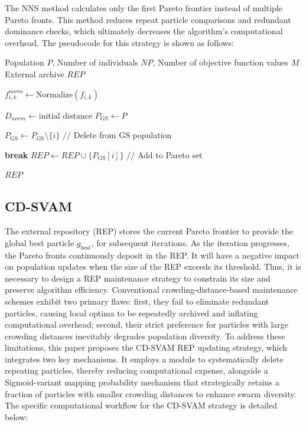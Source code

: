 \documentclass[lettersize,journal]{IEEEtran}
\begin{document}
The NNS method calculates only the first Pareto frontier instead of multiple Pareto fronts. This method reduces repeat particle comparisons and redundant dominance checks, which ultimately decreases the algorithm's computational overhead. The pseudocode for this strategy is shown as follows:
\begin{algorithm}[H]
\caption{GS-NNS Strategy}\label{alg:GS_Strategy}
\renewcommand{\algorithmicrequire}{\textbf{Input:}}
\renewcommand{\algorithmicensure}{\textbf{Output:}}
\begin{algorithmic}[1] %
\REQUIRE Population $P$, Number of individuals $NP$, Number of objective function values $M$
\ENSURE External archive $REP$

        \STATE $f_{i,k}^{norm} \gets \text{Normalize}(f_{i,k})$
    \ENDFOR
\ENDFOR

\STATE $D_{norm} \gets \text{initial distance}$
\STATE $P_{\text{GS}} \gets P$ 

        \STATE $P_{\text{GS}} \gets P_{\text{GS}} \setminus \{i\}$ // Delete from GS population
    \ENDIF
\ENDFOR

            \STATE \textbf{break}
        \ENDIF
    \ENDFOR
        \STATE $REP \gets REP \cup \{P_{\text{GS}}[i]\}$ // Add to Pareto set
    \ENDIF
\ENDFOR

\RETURN $REP$
\end{algorithmic}
\end{algorithm}



\subsection{CD-SVAM}
The external repository (REP) stores the current Pareto frontier to provide the global best particle $g_{\text{best}}$, for subsequent iterations. As the iteration progresses, the Pareto fronts continuously deposit in the REP. It will have a negative impact on population updates when the size of the REP exceeds its threshold. Thus, it is necessary to design a REP maintenance strategy to constrain its size and preserve algorithm efficiency. Conventional crowding-distance-based maintenance schemes exhibit two primary flaws: first, they fail to eliminate redundant particles, causing local optima to be repeatedly archived and inflating computational overhead; second, their strict preference for particles with large crowding distances inevitably degrades population diversity. To address these limitations, this paper proposes the CD-SVAM REP updating strategy, which integrates two key mechanisms. It employs a module to systematically delete repeating particles, thereby reducing computational expense, alongside a Sigmoid-variant mapping probability mechanism that strategically retains a fraction of particles with smaller crowding distances to enhance swarm diversity. The specific computational workflow for the CD-SVAM strategy is detailed below:
\end{document}
